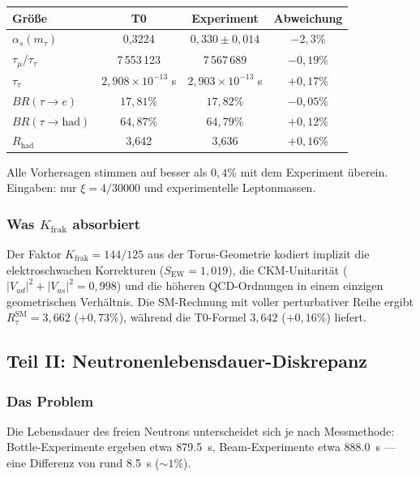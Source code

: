 	\begin{center}
		\small
		\begin{tabular}{lccc}
			\textbf{Größe} & \textbf{T0} & \textbf{Experiment} & \textbf{Abweichung} \\
			\hline
			\(\alpha_s(m_\tau)\) & 0,3224 & \(0{,}330 \pm 0{,}014\) & \(-2{,}3\%\) \\
			\(\tau_\mu/\tau_\tau\) & 7\,553\,123 & 7\,567\,689 & \(-0{,}19\%\) \\
			\(\tau_\tau\) & \(2{,}908 \times 10^{-13}\) s & \(2{,}903 \times 10^{-13}\) s & \(+0{,}17\%\) \\
			\(BR(\tau \to e)\) & \(17{,}81\%\) & \(17{,}82\%\) & \(-0{,}05\%\) \\
			\(BR(\tau \to \text{had})\) & \(64{,}87\%\) & \(64{,}79\%\) & \(+0{,}12\%\) \\
			\(R_\text{had}\) & 3,642 & 3,636 & \(+0{,}16\%\) \\
		\end{tabular}
	\end{center}
	
	Alle Vorhersagen stimmen auf besser als \(0{,}4\%\) mit dem Experiment überein. Eingaben: nur \(\xi = 4/30000\) und experimentelle Leptonmassen.
	
	\subsubsection*{Was \(K_\text{frak}\) absorbiert}
	
	Der Faktor \(K_\text{frak} = 144/125\) aus der Torus-Geometrie kodiert implizit die elektroschwachen Korrekturen (\(S_\text{EW} = 1{,}019\)), die CKM-Unitarität (\(|V_{ud}|^2 + |V_{us}|^2 = 0{,}998\)) und die höheren QCD-Ordnungen in einem einzigen geometrischen Verhältnis. Die SM-Rechnung mit voller perturbativer Reihe ergibt \(R_\tau^\text{SM} = 3{,}662\) (\(+0{,}73\%\)), während die T0-Formel \(3{,}642\) (\(+0{,}16\%\)) liefert.
	
	
	\subsection*{Teil II: Neutronenlebensdauer-Diskrepanz}
	
	\subsubsection*{Das Problem}
	
	Die Lebensdauer des freien Neutrons unterscheidet sich je nach Messmethode: Bottle-Experimente ergeben etwa \SI{879,5}{\second}, Beam-Experimente etwa \SI{888,0}{\second} — eine Differenz von rund \SI{8,5}{\second} (\(\sim 1\%\)).
	
